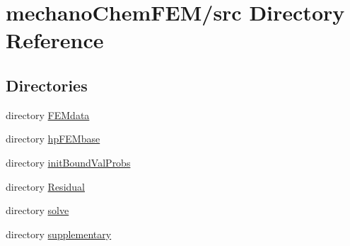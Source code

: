 \section{mechano\+Chem\+F\+E\+M/src Directory Reference}
\label{dir_bed9c470f5df7238d8dd6d57b10c0822}
\subsection*{Directories}
\begin{DoxyCompactItemize}
\item 
directory \mbox{\hyperlink{dir_2dd72f5f1bfd972b5ee926207c36fff5}{F\+E\+Mdata}}
\item 
directory \mbox{\hyperlink{dir_f9631a46b8da6706fb7cd09bbe3d9ebd}{hp\+F\+E\+Mbase}}
\item 
directory \mbox{\hyperlink{dir_4f4f39f3c8a43cd00cf68b431ac1095b}{init\+Bound\+Val\+Probs}}
\item 
directory \mbox{\hyperlink{dir_023d627fbb8138760617bfe5d957f0cc}{Residual}}
\item 
directory \mbox{\hyperlink{dir_28284d899b4c01c72973addf0d42f06a}{solve}}
\item 
directory \mbox{\hyperlink{dir_c90701abf2b957e4dad90d74dd66ad6d}{supplementary}}
\end{DoxyCompactItemize}
